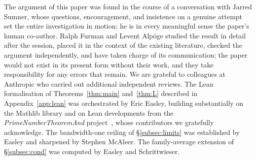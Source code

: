 \documentclass[11pt]{amsart}
\theoremstyle{definition}
\theoremstyle{remark}
\numberwithin{equation}{section}
\begin{document}
The argument of this paper was found in the course of a conversation with Jarred Sumner, whose questions, encouragement, and insistence on a genuine attempt set the entire investigation in motion; he is in every meaningful sense the paper's human co-author. Ralph Furman and Levent Alp\"oge studied the result in detail after the session, placed it in the context of the existing literature, checked the argument independently, and have taken charge of its communication; the paper would not exist in its present form without their work, and they take responsibility for any errors that remain. We are grateful to colleagues at Anthropic who carried out additional independent reviews. The Lean formalisation of Theorems~\ref{thm:main} and~\ref{thm:L} described in Appendix~\ref{app:lean} was orchestrated by Eric Easley, building substantially on the Mathlib library and on Lean developments from the \emph{PrimeNumberTheoremAnd} project~\cite{PNTplus}, whose contributors we gratefully acknowledge. The bandwidth-one ceiling of \S\ref{subsec:limits} was established by Easley and sharpened by Stephen McAleer. The family-average extension of \S\ref{subsec:cond} was computed by Easley and Schrittwieser.
\end{document}
